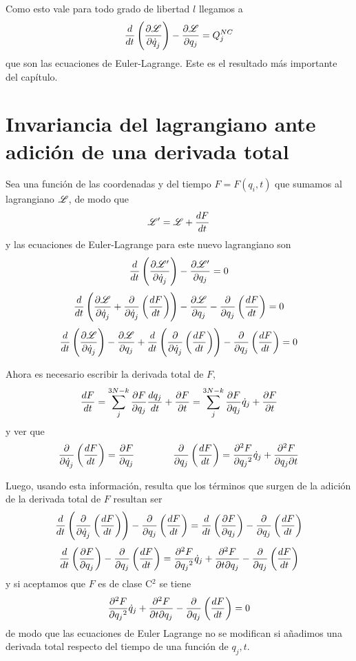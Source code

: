 \documentclass[10pt,oneside]{CBFT_book}
\begin{document}
Como esto vale para todo grado de libertad $l$ llegamos a
\[
	\frac{d}{dt} \left( \dpar{\Lag}{\dot{q}_j} \right) -  \dpar{\Lag}{q_j} = Q_j^{NC}
\]
que son las ecuaciones de Euler-Lagrange. Este es el resultado más importante del capítulo.

\section{Invariancia del lagrangiano ante adición de una derivada total}

Sea una función de las coordenadas y del tiempo $F=F(q_i,t)$ que sumamos al lagrangiano $\Lag$, de modo que
\[
	\Lag'=\Lag + \dtot{F}{t} 
\]
y las ecuaciones de Euler-Lagrange para este nuevo lagrangiano son
\[
	\frac{d}{dt}\left(\dpar{\Lag'}{\dot{q}_j}\right) - \dpar{\Lag'}{q_j} = 0
\]
\[
	\dtot{}{t}\left(\dpar{\Lag}{\dot{q}_j} + \dpar{}{\dot{q}_j}\left(\dtot{F}{t}\right)\right) -
	\dpar{\Lag}{q_j} - \dpar{}{q_j}\left( \dtot{F}{t}\right) = 0 
\]
\[
	\dtot{}{t}\left(\dpar{\Lag}{\dot{q}_j}\right) - \dpar{\Lag}{q_j} + 
	\dtot{}{t}\left(\dpar{}{\dot{q}_j}\left(\dtot{F}{t}\right)\right) 
	- \dpar{}{q_j}\left( \dtot{F}{t}\right) = 0 
\]

Ahora es necesario escribir la derivada total de $F$,
\[
	\dtot{F}{t} = \sum_j^{3N-k} \dpar{F}{q_j}\dtot{q_j}{t} + \dpar{F}{t} =
			\sum_j^{3N-k} \dpar{F}{q_j}\dot{q}_j + \dpar{F}{t}
\]
y ver que
\[
	\dpar{}{\dot{q}_j}\left(\dtot{F}{t}\right) = \dpar{F}{q_j} \qquad\qquad
	\dpar{}{q_j}\left(\dtot{F}{t}\right) = \dpar[2]{F}{q_j} \dot{q}_j + \dparcru{F}{t}{q_j} 
\]

Luego, usando esta información, resulta que los términos que surgen de la adición de la derivada total de $F$ resultan 
ser
\[
	\dtot{}{t}\left( \dpar{}{\dot{q}_j}\left(\dtot{F}{t}\right)\right) - 
	\dpar{}{q_j}\left( \dtot{F}{t}\right) = \dtot{}{t}\left( \dpar{F}{q_j} \right) - 
	\dpar{}{q_j}\left( \dtot{F}{t}\right)
\]
\[
	\dtot{}{t}\left( \dpar{F}{q_j} \right) - \dpar{}{q_j}\left( \dtot{F}{t}\right) =
	\dpar[2]{F}{q_j} \dot{q}_j + \dparcru{F}{q_j}{t} - \dpar{}{q_j}\left( \dtot{F}{t}\right)
\]
y si aceptamos que $F$ es de clase C$^2$ se tiene
\[
	\dpar[2]{F}{q_j} \dot{q}_j + \dparcru{F}{q_j}{t} - \dpar{}{q_j}\left( \dtot{F}{t}\right)=0
\]
de modo que las ecuaciones de Euler Lagrange no se modifican si añadimos una derivada total respecto del tiempo de una 
función de $q_j,t$.
\end{document}
